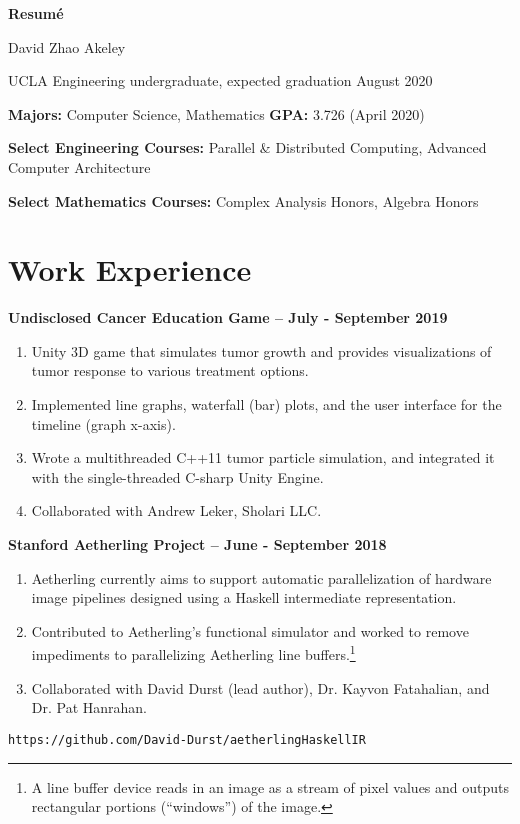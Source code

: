 \documentclass[11pt]{article}
\begin{document}
\begin{center}
\Large{\textbf{Resum\'e}}

\normalsize David Zhao Akeley

UCLA Engineering undergraduate, expected graduation August 2020
\end{center}


\textbf{Majors:} Computer Science, Mathematics
\quad \textbf{GPA:} 3.726 (April 2020)

\textbf{Select Engineering Courses:} Parallel \& Distributed Computing,
Advanced Computer Architecture

\textbf{Select Mathematics Courses:} Complex Analysis Honors, Algebra Honors

\section{Work Experience}

\textbf{Undisclosed Cancer Education Game -- July - September 2019}
\begin{enumerate}
\item Unity 3D game that simulates tumor growth and provides visualizations
  of tumor response to various treatment options.
\item Implemented line graphs, waterfall (bar) plots, and the user
  interface for the timeline (graph x-axis).
\item Wrote a multithreaded C++11 tumor particle simulation, and integrated
  it with the single-threaded C-sharp Unity Engine.
\item Collaborated with Andrew Leker, Sholari LLC.
\end{enumerate}

\textbf{Stanford Aetherling Project -- June - September 2018}
\begin{enumerate}
\item Aetherling currently aims to support automatic parallelization
  of hardware image pipelines designed using a Haskell intermediate
  representation.
\item Contributed to Aetherling's functional simulator and worked to
  remove impediments to parallelizing Aetherling line
  buffers.\footnote{A line buffer device reads in an image as a stream
    of pixel values and outputs rectangular portions (``windows'') of
    the image.}
\item Collaborated with David Durst (lead author), Dr. Kayvon
  Fatahalian, and Dr. Pat Hanrahan.
\end{enumerate}
\quad\texttt{https://github.com/David-Durst/aetherlingHaskellIR}
\end{document}
